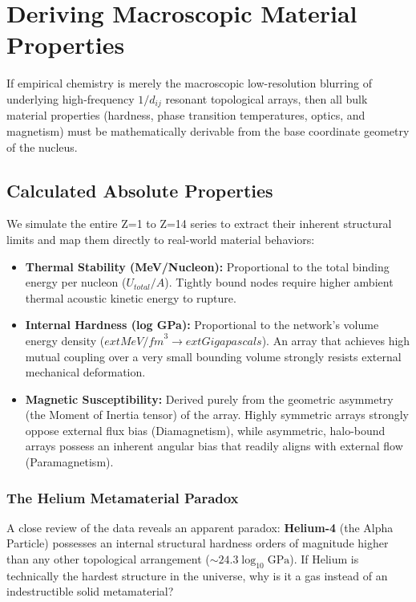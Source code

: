 \chapter{Deriving Macroscopic Material Properties}
\label{ch:derived_properties}

If empirical chemistry is merely the macroscopic low-resolution blurring of underlying high-frequency $1/d_{ij}$ resonant topological arrays, then all bulk material properties (hardness, phase transition temperatures, optics, and magnetism) must be mathematically derivable from the base coordinate geometry of the nucleus.

\section{Calculated Absolute Properties}
We simulate the entire Z=1 to Z=14 series to extract their inherent structural limits and map them directly to real-world material behaviors:
\begin{itemize}
    \item \textbf{Thermal Stability (MeV/Nucleon):} Proportional to the total binding energy per nucleon ($U_{total} / A$). Tightly bound nodes require higher ambient thermal acoustic kinetic energy to rupture.
    \item \textbf{Internal Hardness (log GPa):} Proportional to the network's volume energy density ($	ext{MeV/fm}^3 \to 	ext{Gigapascals}$). An array that achieves high mutual coupling over a very small bounding volume strongly resists external mechanical deformation.
    \item \textbf{Magnetic Susceptibility:} Derived purely from the geometric asymmetry (the Moment of Inertia tensor) of the array. Highly symmetric arrays strongly oppose external flux bias (Diamagnetism), while asymmetric, halo-bound arrays possess an inherent angular bias that readily aligns with external flow (Paramagnetism).
\end{itemize}

\subsection*{The Helium Metamaterial Paradox}
A close review of the data reveals an apparent paradox: \textbf{Helium-4} (the Alpha Particle) possesses an internal structural hardness orders of magnitude higher than any other topological arrangement ($\sim 24.3 \log_{10} \text{GPa}$). If Helium is technically the hardest structure in the universe, why is it a gas instead of an indestructible solid metamaterial?

